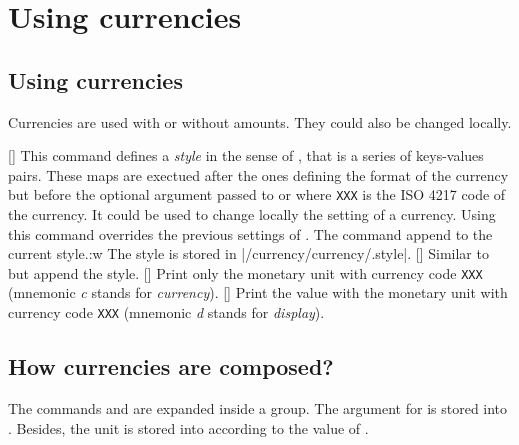 \documentclass[12pt,add-index]{cnltx-doc}
\begin{document}
\section{Using currencies}
\label{sec:using}

\subsection{Using currencies}

Currencies are used with or without amounts. They could also be changed locally. 

\begin{commands}
    []
    This command defines a \emph{style} in the sense of , that 
    is a series of keys-values pairs.  
    These maps are exectued after
    the ones defining the format of the currency but before the optional 
    argument passed to  or  where \texttt{XXX} is
    the ISO 4217 code of the currency. It could be used to change locally 
    the setting of a currency. Using this command overrides the previous settings of
    . The command  append to the current style.:w
    The style is stored in \verbcode|/currency/currency/.style|.
    [] Similar to  but 
    append the style.
    [] Print only the monetary unit with currency code \texttt{XXX}
    (mnemonic \textit{c} stands for \textit{currency}).
    [] Print the value with the monetary unit with currency code \texttt{XXX} (mnemonic \textit{d} stands for \textit{display}).
\end{commands}

\subsection{How currencies are composed?}

The commands  and  are expanded inside a group. 
The argument  for  is stored into .
Besides, the unit is stored into  according 
to the value of .
\end{document}
